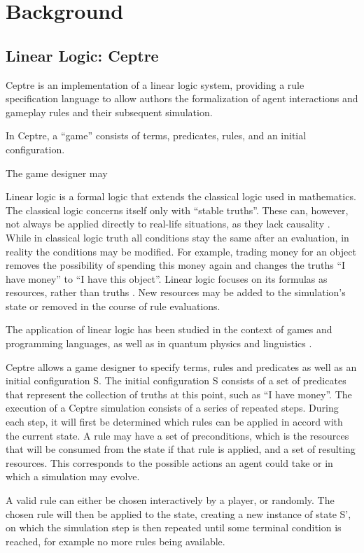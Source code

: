 \section{Background} \label{background}

\subsection{Linear Logic: Ceptre} \label{linear_logic}

Ceptre is an implementation of a linear logic system, providing a rule specification language to allow authors the formalization of agent interactions and gameplay rules and their subsequent simulation.

In Ceptre, a \enquote{game} consists of terms, predicates, rules, and an initial configuration.

The game designer may 

Linear logic is a formal logic that extends the classical logic used in mathematics.
The classical logic concerns itself only with \enquote{stable truths}.
These can, however, not always be applied directly to real-life situations, as they lack causality \cite{girard_1995}.
While in classical logic truth all conditions stay the same after an evaluation, in reality the conditions may be modified.
For example, trading money for an object removes the possibility of spending this money again and changes the truths \enquote{I have money} to \enquote{I have this object}.
Linear logic focuses on its formulas as resources, rather than truths \cite{sep-logic-linear}.
New resources may be added to the simulation's state or removed in the course of rule evaluations.

The application of linear logic has been studied in the context of games and programming languages, as well as in quantum physics and linguistics \cite{sep-logic-linear}. 

Ceptre allows a game designer to specify terms, rules and predicates as well as an initial configuration S.
The initial configuration S consists of a set of predicates that represent the collection of truths at this point, such as \enquote{I have money}.
The execution of a Ceptre simulation consists of a series of repeated steps.
During each step, it will first be determined which rules can be applied in accord with the current state.
A rule may have a set of preconditions, which is the resources that will be consumed from the state if that rule is applied, and a set of resulting resources.
This corresponds to the possible actions an agent could take or in which a simulation may evolve.

A valid rule can either be chosen interactively by a player, or randomly. 
The chosen rule will then be applied to the state, creating a new instance of state S', on which the simulation step is then repeated until some terminal condition is reached, for example no more rules being available.
